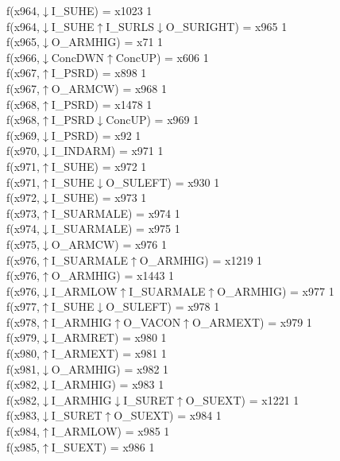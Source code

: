 f(x964,$\downarrow$I\_SUHE) = x1023 {1} \\
f(x964,$\downarrow$I\_SUHE$\uparrow$I\_SURLS$\downarrow$O\_SURIGHT) = x965 {1} \\
f(x965,$\downarrow$O\_ARMHIG) = x71 {1} \\
f(x966,$\downarrow$ConcDWN$\uparrow$ConcUP) = x606 {1} \\
f(x967,$\uparrow$I\_PSRD) = x898 {1} \\
f(x967,$\uparrow$O\_ARMCW) = x968 {1} \\
f(x968,$\uparrow$I\_PSRD) = x1478 {1} \\
f(x968,$\uparrow$I\_PSRD$\downarrow$ConcUP) = x969 {1} \\
f(x969,$\downarrow$I\_PSRD) = x92 {1} \\
f(x970,$\downarrow$I\_INDARM) = x971 {1} \\
f(x971,$\uparrow$I\_SUHE) = x972 {1} \\
f(x971,$\uparrow$I\_SUHE$\downarrow$O\_SULEFT) = x930 {1} \\
f(x972,$\downarrow$I\_SUHE) = x973 {1} \\
f(x973,$\uparrow$I\_SUARMALE) = x974 {1} \\
f(x974,$\downarrow$I\_SUARMALE) = x975 {1} \\
f(x975,$\downarrow$O\_ARMCW) = x976 {1} \\
f(x976,$\uparrow$I\_SUARMALE$\uparrow$O\_ARMHIG) = x1219 {1} \\
f(x976,$\uparrow$O\_ARMHIG) = x1443 {1} \\
f(x976,$\downarrow$I\_ARMLOW$\uparrow$I\_SUARMALE$\uparrow$O\_ARMHIG) = x977 {1} \\
f(x977,$\uparrow$I\_SUHE$\downarrow$O\_SULEFT) = x978 {1} \\
f(x978,$\uparrow$I\_ARMHIG$\uparrow$O\_VACON$\uparrow$O\_ARMEXT) = x979 {1} \\
f(x979,$\downarrow$I\_ARMRET) = x980 {1} \\
f(x980,$\uparrow$I\_ARMEXT) = x981 {1} \\
f(x981,$\downarrow$O\_ARMHIG) = x982 {1} \\
f(x982,$\downarrow$I\_ARMHIG) = x983 {1} \\
f(x982,$\downarrow$I\_ARMHIG$\downarrow$I\_SURET$\uparrow$O\_SUEXT) = x1221 {1} \\
f(x983,$\downarrow$I\_SURET$\uparrow$O\_SUEXT) = x984 {1} \\
f(x984,$\uparrow$I\_ARMLOW) = x985 {1} \\
f(x985,$\uparrow$I\_SUEXT) = x986 {1} \\
